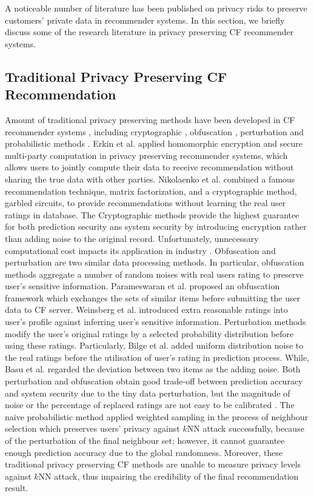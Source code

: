 \documentclass[11pt]{article}
\begin{document}
A noticeable number of literature has been published on privacy risks to preserve customers' private data in recommender systems. In this section, we briefly discuss some of the research literature in privacy preserving CF recommender systems.

\subsection{Traditional Privacy Preserving CF Recommendation}
Amount of traditional privacy preserving methods have been developed in CF recommender systems \cite{ZHU2014}, including cryptographic \cite{ERKIN2010, NIKOLAENKO2013}, obfuscation \cite{PARAMESWARAN2007, WEINSBERG2012}, perturbation \cite{BASU2012, BILGE2012} and probabilistic methods \cite{ADAMOPOULOS2014}. Erkin et al. \cite{ERKIN2010} applied homomorphic encryption and secure multi-party computation in privacy preserving recommender systems, which allows users to jointly compute their data to receive recommendation without sharing the true data with other parties. Nikolaenko et al. \cite{NIKOLAENKO2013} combined a famous recommendation technique, matrix factorization, and a cryptographic method, garbled circuits, to provide recommendations without learning the real user ratings in database. The Cryptographic methods provide the highest guarantee for both prediction security ans system security by introducing encryption rather than adding noise to the original record. Unfortunately, unnecessary computational cost impacts its application in industry \cite{ZHU2014}. Obfuscation and perturbation are two similar data processing methods. In particular, obfuscation methods aggregate a number of random noises with real users rating to preserve user's sensitive information. Parameswaran et al. \cite{PARAMESWARAN2007} proposed an obfuscation framework which exchanges the sets of similar items before submitting the user data to CF server. Weinsberg et al. \cite{WEINSBERG2012} introduced extra reasonable ratings into user's profile against inferring user's sensitive information. Perturbation methods modify the user's original ratings by a selected probability distribution before using these ratings. Particularly, Bilge et al. \cite{BILGE2012} added uniform distribution noise to the real ratings before the utilisation of user's rating in prediction process. While, Basu et al. \cite{BASU2012} regarded the deviation between two items as the adding noise. Both perturbation and obfuscation obtain good trade-off between prediction accuracy and system security due to the tiny data perturbation, but the magnitude of noise or the percentage of replaced ratings are not easy to be calibrated \cite{DWORK2006B, ZHU2014}. The naive probabilistic method \cite{ADAMOPOULOS2014} applied weighted sampling in the process of neighbour selection which preserves users' privacy against $k$NN attack successfully, because of the perturbation of the final neighbour set; however, it cannot guarantee enough prediction accuracy due to the global randomness. Moreover, these traditional privacy preserving CF methods are unable to measure privacy levels against $k$NN attack, thus impairing the credibility of the final recommendation result.
\end{document}
